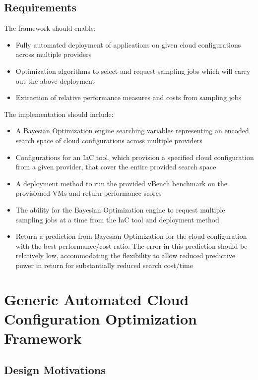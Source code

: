 \documentclass{report}
\begin{document}
\section{Requirements}
The framework should enable:
\begin{itemize}
\singlespacing
\item Fully automated deployment of applications on given cloud configurations across multiple providers
\item Optimization algorithms to select and request sampling jobs which will carry out the above deployment
\item Extraction of relative performance measures and costs from sampling jobs
\end{itemize}
The implementation should include:
\begin{itemize}
\singlespacing
\item A Bayesian Optimization engine searching variables representing an encoded search space of cloud configurations across multiple providers
\item Configurations for an IaC tool, which provision a specified cloud configuration from a given provider, that cover the entire provided search space
\item A deployment method to run the provided vBench benchmark on the provisioned VMs and return performance scores
\item The ability for the Bayesian Optimization engine to request multiple sampling jobs at a time from the IaC tool and deployment method
\item Return a prediction from Bayesian Optimization for the cloud configuration with the best performance/cost ratio. The error in this prediction should be relatively low, accommodating the flexibility to allow reduced predictive power in return for substantially reduced search cost/time
\end{itemize}

\chapter{Generic Automated Cloud Configuration Optimization Framework}
\section{Design Motivations}
\end{document}

